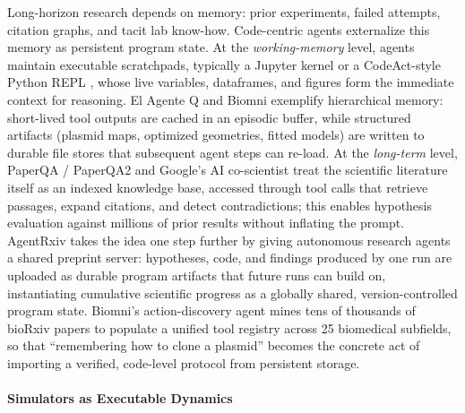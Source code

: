 Long-horizon research depends on memory: prior experiments, failed attempts, citation graphs, and tacit lab know-how. Code-centric agents externalize this memory as persistent program state. At the \textit{working-memory} level, agents maintain executable scratchpads,  typically a Jupyter kernel or a CodeAct-style Python REPL \citep{jiang2025aideaidrivenexplorationspace},  whose live variables, dataframes, and figures form the immediate context for reasoning. El Agente Q \citep{Zou_2025} and Biomni \citep{huang2025biomni} exemplify hierarchical memory: short-lived tool outputs are cached in an episodic buffer, while structured artifacts (plasmid maps, optimized geometries, fitted models) are written to durable file stores that subsequent agent steps can re-load. At the \textit{long-term} level, PaperQA / PaperQA2 \citep{lala2023paperqaretrievalaugmentedgenerativeagent} and Google's AI co-scientist \citep{gottweis2025aicoscientist} treat the scientific literature itself as an indexed knowledge base, accessed through tool calls that retrieve passages, expand citations, and detect contradictions; this enables hypothesis evaluation against millions of prior results without inflating the prompt. AgentRxiv \citep{schmidgall2025agentrxivcollaborativeautonomousresearch} takes the idea one step further by giving autonomous research agents a shared preprint server: hypotheses, code, and findings produced by one run are uploaded as durable program artifacts that future runs can build on, instantiating cumulative scientific progress as a globally shared, version-controlled program state. Biomni's action-discovery agent \citep{huang2025biomni} mines tens of thousands of bioRxiv papers to populate a unified tool registry across 25 biomedical subfields, so that ``remembering how to clone a plasmid'' becomes the concrete act of importing a verified, code-level protocol from persistent storage.

\paragraph{Simulators as Executable Dynamics}

